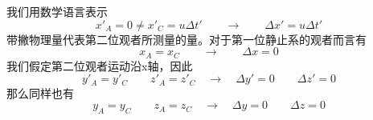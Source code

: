 我们用数学语言表示
\begin{equation}\label{eq2.2}
  x'_A=0 \neq x'_C=u \Delta t' \qquad \rightarrow \qquad \Delta x' =u \Delta t'
\end{equation}
带撇物理量代表第二位观者所测量的量。对于第一位静止系的观者而言有
\begin{equation}\label{eq2.3}
  x_A=x_C \qquad \rightarrow \qquad \Delta x=0
\end{equation}
我们假定第二位观者运动沿x轴，因此
\begin{equation}\label{eq2.4}
 y'_A=y'_C \quad  \quad z'_A=z'_C \quad \rightarrow \quad \Delta y'=0 \quad  \quad \Delta z'=0
\end{equation}
那么同样也有
\begin{equation}\label{eq2.5}
 y_A=y_C \quad  \quad z_A=z_C \quad \rightarrow \quad \Delta y=0 \quad  \quad \Delta z=0
\end{equation}

